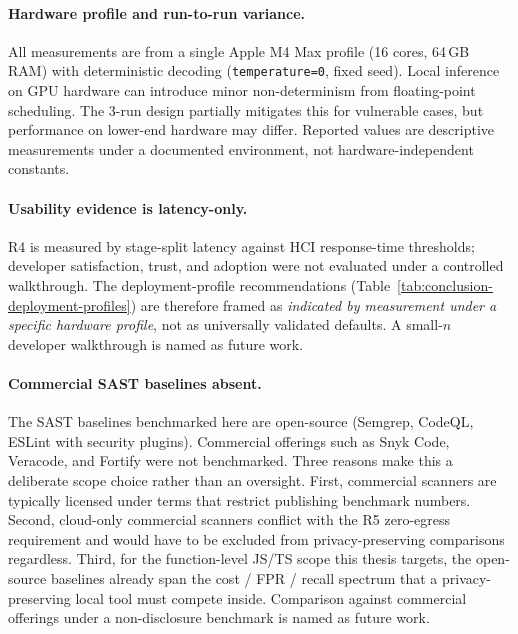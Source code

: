 \paragraph{Hardware profile and run-to-run variance.}
All measurements are from a single Apple M4 Max profile (16 cores, 64\,GB RAM) with deterministic decoding (\texttt{temperature=0}, fixed seed). Local inference on GPU hardware can introduce minor non-determinism from floating-point scheduling. The 3-run design partially mitigates this for vulnerable cases, but performance on lower-end hardware may differ. Reported values are descriptive measurements under a documented environment, not hardware-independent constants.

\paragraph{Usability evidence is latency-only.}
R4 is measured by stage-split latency against HCI response-time thresholds; developer satisfaction, trust, and adoption were not evaluated under a controlled walkthrough. The deployment-profile recommendations (Table~\ref{tab:conclusion-deployment-profiles}) are therefore framed as \emph{indicated by measurement under a specific hardware profile}, not as universally validated defaults. A small-$n$ developer walkthrough is named as future work.

\paragraph{Commercial SAST baselines absent.}
The SAST baselines benchmarked here are open-source (Semgrep, CodeQL, ESLint with security plugins). Commercial offerings such as Snyk Code, Veracode, and Fortify were not benchmarked. Three reasons make this a deliberate scope choice rather than an oversight. First, commercial scanners are typically licensed under terms that restrict publishing benchmark numbers. Second, cloud-only commercial scanners conflict with the R5 zero-egress requirement and would have to be excluded from privacy-preserving comparisons regardless. Third, for the function-level JS/TS scope this thesis targets, the open-source baselines already span the cost / FPR / recall spectrum that a privacy-preserving local tool must compete inside. Comparison against commercial offerings under a non-disclosure benchmark is named as future work.

